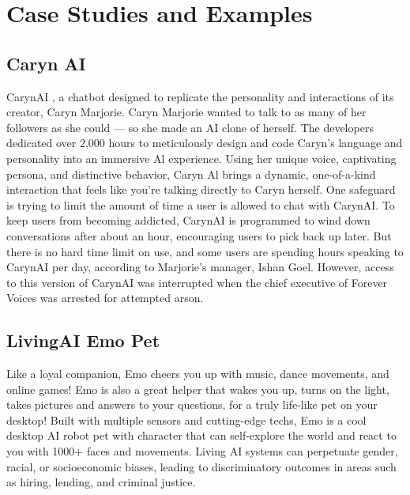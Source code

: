 \section{Case Studies and Examples}
\subsection{Caryn AI}
CarynAI \cite{lorenz2023influencers}, a chatbot designed to replicate the personality and interactions of its creator, Caryn Marjorie. Caryn Marjorie wanted to talk to as many of her followers as she could — so she made an AI clone of herself. The developers dedicated over 2,000 hours to meticulously design and code Caryn's language and personality into an immersive Al experience. Using her unique voice, captivating persona, and distinctive behavior, Caryn Al brings a dynamic, one-of-a-kind interaction that feels like you're talking directly to Caryn herself. One safeguard is trying to limit the amount of time a user is allowed to chat with CarynAI. To keep users from becoming addicted, CarynAI is programmed to wind down conversations after about an hour, encouraging users to pick back up later. But there is no hard time limit on use, and some users are spending hours speaking to CarynAI per day, according to Marjorie's manager, Ishan Goel. However, access to this version of CarynAI was interrupted when the chief executive of Forever Voices was arrested for attempted arson.
\subsection{LivingAI Emo Pet}
Like a loyal companion, Emo cheers you up with music, dance movements, and online games! Emo is also a great helper that wakes you up, turns on the light, takes pictures and answers to your questions, for a truly life-like pet on your desktop! Built with multiple sensors and cutting-edge techs, Emo is a cool desktop AI robot pet with character that can self-explore the world and react to you with 1000+ faces and movements. Living AI systems can perpetuate gender, racial, or socioeconomic biases, leading to discriminatory outcomes in areas such as hiring, lending, and criminal justice.
